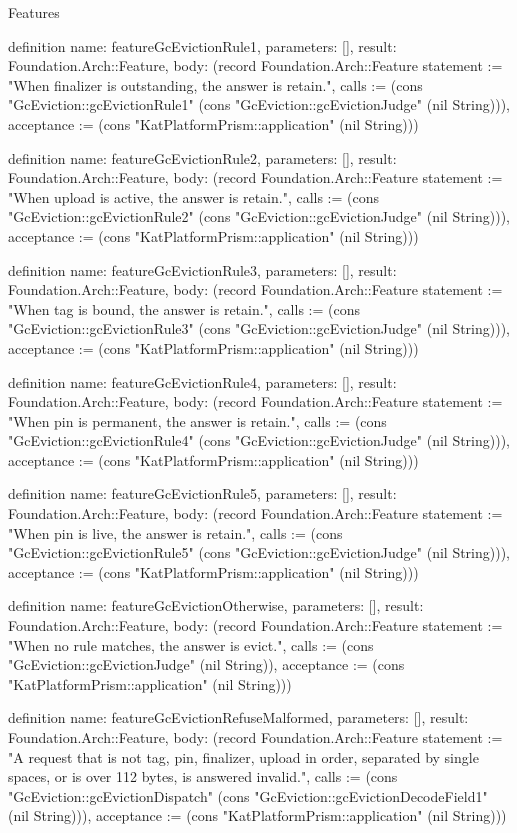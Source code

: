 \begin{lexlean}{Features}
\begin{semanticmodule}
definition{
  name: featureGcEvictionRule1,
  parameters: [],
  result: Foundation.Arch::Feature,
  body: (record Foundation.Arch::Feature {statement := "When finalizer is outstanding, the answer is retain.", calls := (cons "GcEviction::gcEvictionRule1" (cons "GcEviction::gcEvictionJudge" (nil String))), acceptance := (cons "KatPlatformPrism::application" (nil String))})
}

definition{
  name: featureGcEvictionRule2,
  parameters: [],
  result: Foundation.Arch::Feature,
  body: (record Foundation.Arch::Feature {statement := "When upload is active, the answer is retain.", calls := (cons "GcEviction::gcEvictionRule2" (cons "GcEviction::gcEvictionJudge" (nil String))), acceptance := (cons "KatPlatformPrism::application" (nil String))})
}

definition{
  name: featureGcEvictionRule3,
  parameters: [],
  result: Foundation.Arch::Feature,
  body: (record Foundation.Arch::Feature {statement := "When tag is bound, the answer is retain.", calls := (cons "GcEviction::gcEvictionRule3" (cons "GcEviction::gcEvictionJudge" (nil String))), acceptance := (cons "KatPlatformPrism::application" (nil String))})
}

definition{
  name: featureGcEvictionRule4,
  parameters: [],
  result: Foundation.Arch::Feature,
  body: (record Foundation.Arch::Feature {statement := "When pin is permanent, the answer is retain.", calls := (cons "GcEviction::gcEvictionRule4" (cons "GcEviction::gcEvictionJudge" (nil String))), acceptance := (cons "KatPlatformPrism::application" (nil String))})
}

definition{
  name: featureGcEvictionRule5,
  parameters: [],
  result: Foundation.Arch::Feature,
  body: (record Foundation.Arch::Feature {statement := "When pin is live, the answer is retain.", calls := (cons "GcEviction::gcEvictionRule5" (cons "GcEviction::gcEvictionJudge" (nil String))), acceptance := (cons "KatPlatformPrism::application" (nil String))})
}

definition{
  name: featureGcEvictionOtherwise,
  parameters: [],
  result: Foundation.Arch::Feature,
  body: (record Foundation.Arch::Feature {statement := "When no rule matches, the answer is evict.", calls := (cons "GcEviction::gcEvictionJudge" (nil String)), acceptance := (cons "KatPlatformPrism::application" (nil String))})
}

definition{
  name: featureGcEvictionRefuseMalformed,
  parameters: [],
  result: Foundation.Arch::Feature,
  body: (record Foundation.Arch::Feature {statement := "A request that is not tag, pin, finalizer, upload in order, separated by single spaces, or is over 112 bytes, is answered invalid.", calls := (cons "GcEviction::gcEvictionDispatch" (cons "GcEviction::gcEvictionDecodeField1" (nil String))), acceptance := (cons "KatPlatformPrism::application" (nil String))})
}


\end{semanticmodule}
\end{lexlean}
